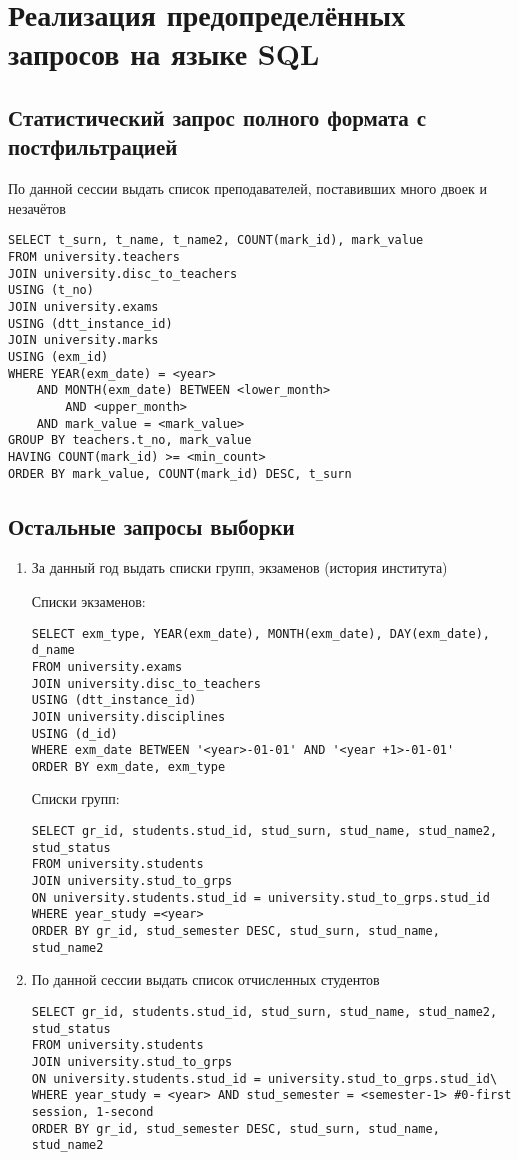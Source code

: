 \documentclass[zuevDbReport.tex]{subfiles}
\begin{document}
\newpage
\section{Реализация предопределённых запросов на языке SQL}
\subsection{Статистический запрос полного формата с постфильтрацией}
По данной сессии выдать список преподавателей, поставивших много двоек и незачётов\\
\begin{lstlisting}
SELECT t_surn, t_name, t_name2, COUNT(mark_id), mark_value 
FROM university.teachers
JOIN university.disc_to_teachers
USING (t_no)
JOIN university.exams
USING (dtt_instance_id)
JOIN university.marks
USING (exm_id)
WHERE YEAR(exm_date) = <year>
	AND MONTH(exm_date) BETWEEN <lower_month> 
		AND <upper_month>
	AND mark_value = <mark_value>
GROUP BY teachers.t_no, mark_value
HAVING COUNT(mark_id) >= <min_count>
ORDER BY mark_value, COUNT(mark_id) DESC, t_surn
\end{lstlisting}
\subsection{Остальные запросы выборки}
\begin{enumerate}
\item{}За данный год выдать списки групп, экзаменов (история института)\par

Списки экзаменов:
\begin{lstlisting}
SELECT exm_type, YEAR(exm_date), MONTH(exm_date), DAY(exm_date), d_name
FROM university.exams
JOIN university.disc_to_teachers
USING (dtt_instance_id)
JOIN university.disciplines
USING (d_id)
WHERE exm_date BETWEEN '<year>-01-01' AND '<year +1>-01-01'
ORDER BY exm_date, exm_type
\end{lstlisting}

Списки групп:
\begin{lstlisting}
SELECT gr_id, students.stud_id, stud_surn, stud_name, stud_name2, stud_status
FROM university.students
JOIN university.stud_to_grps
ON university.students.stud_id = university.stud_to_grps.stud_id
WHERE year_study =<year>
ORDER BY gr_id, stud_semester DESC, stud_surn, stud_name, stud_name2
\end{lstlisting}

\item{}По данной сессии выдать список отчисленных студентов

\begin{lstlisting}
SELECT gr_id, students.stud_id, stud_surn, stud_name, stud_name2, stud_status
FROM university.students
JOIN university.stud_to_grps
ON university.students.stud_id = university.stud_to_grps.stud_id\
WHERE year_study = <year> AND stud_semester = <semester-1> #0-first session, 1-second
ORDER BY gr_id, stud_semester DESC, stud_surn, stud_name, stud_name2
\end{lstlisting}

\end{enumerate}
\end{document}
